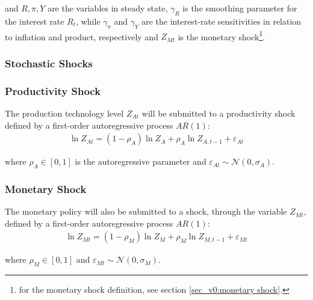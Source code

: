 \documentclass[
thesis.tex
]{subfiles}
\begin{document}
	and $R, \pi, Y$ are the variables in steady state, $\gamma_R$ is the smoothing parameter for the interest rate $R_t$, while $\gamma_\pi$ and $\gamma_Y$ are the interest-rate sensitivities in relation to inflation and product, respectively and $Z_{Mt}$ is the monetary shock\footnote{for the monetary shock definition, see section \ref{sec_v0:monetary shock}.}.
	
	
	\subsubsection{Stochastic Shocks}\label{sec_v0:stochastic-shocks}
	
	\subsubsection*{Productivity Shock} \label{sec_v0:productivity shock}
	
	The production technology level $Z_{At}$ will be submitted to a productivity shock defined by a first-order autoregressive process $AR(1)$:
	\begin{align}
		\ln{Z_{At}} = (1-\rho_A)\ln{Z_A} + \rho_A\ln{Z_{A,t-1}} + \varepsilon_{At} \label{eq_v0:productivity-shock}
	\end{align}
	
	where $\rho_A \in [0,1]$ is the autoregressive parameter and $\varepsilon_{At} \sim \mathscr{N}(0,\sigma_A)$.
	
	\subsubsection*{Monetary Shock} \label{sec_v0:monetary shock}
	
	The monetary policy will also be submitted to a shock, through the variable $Z_{Mt}$, defined by a first-order autoregressive process $AR(1)$:
	\begin{align}
		\ln{Z_{Mt}} = (1-\rho_M)\ln{Z_{M}} + \rho_M\ln{Z_{M,t-1}} + \varepsilon_{Mt} \label{eq_v0:monetary-shock}
	\end{align}
	
	where $\rho_M \in [0,1]$ and $\varepsilon_{Mt} \sim \mathscr{N}(0,\sigma_M)$.
	
	
\end{document}
